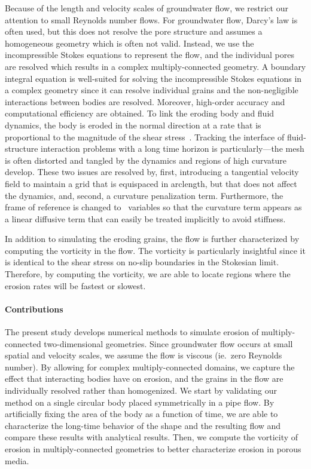 \documentclass[preprint, 10pt]{elsarticle}
\begin{document}
Because of the length and velocity scales of groundwater flow, we
restrict our attention to small Reynolds number flows.  For groundwater
flow, Darcy's law is often used, but this does not resolve the pore
structure and assumes a homogeneous geometry which is often not valid.
Instead, we use the incompressible Stokes equations to represent the
flow, and the individual pores are resolved which results in a complex
multiply-connected geometry.  A boundary integral equation is
well-suited for solving the incompressible Stokes equations in a complex
geometry since it can resolve individual grains and the non-negligible
interactions between bodies are resolved. Moreover, high-order accuracy
and computational efficiency are obtained. To link the eroding body and
fluid dynamics, the body is eroded in the normal direction at a rate
that is proportional to the magnitude of the shear
stress~\cite{ris-moo-chi-she-zha2012}.  Tracking the interface of
fluid-structure interaction problems with a long time horizon is
particularly---the mesh is often distorted and tangled by the dynamics
and regions of high curvature develop.  These two issues are resolved
by, first, introducing a tangential velocity field to maintain a grid
that is equispaced in arclength, but that does not affect the dynamics,
and, second, a curvature penalization term.  Furthermore, the frame of
reference is changed to \thL~variables so that the curvature term
appears as a linear diffusive term that can easily be treated implicitly
to avoid stiffness.

In addition to simulating the eroding grains, the flow is further
characterized by computing the vorticity in the flow.  The vorticity is
particularly insightful since it is identical to the shear stress on
no-slip boundaries in the Stokesian limit.  Therefore, by computing the
vorticity, we are able to locate regions where the erosion rates will be
fastest or slowest.

\paragraph{Contributions} The present study develops numerical methods
to simulate erosion of multiply-connected two-dimensional geometries.
Since groundwater flow occurs at small spatial and velocity scales, we
assume the flow is viscous (ie.~zero Reynolds number).  By allowing for
complex multiply-connected domains, we capture the effect that
interacting bodies have on erosion, and the grains in the flow are
individually resolved rather than homogenized.  We start by validating
our method on a single circular body placed symmetrically in a pipe
flow.  By artificially fixing the area of the body as a function of
time, we are able to characterize the long-time behavior of the shape
and the resulting flow and compare these results with analytical
results.  Then, we compute the vorticity of erosion in
multiply-connected geometries to better characterize erosion in porous
media. 
\end{document}

